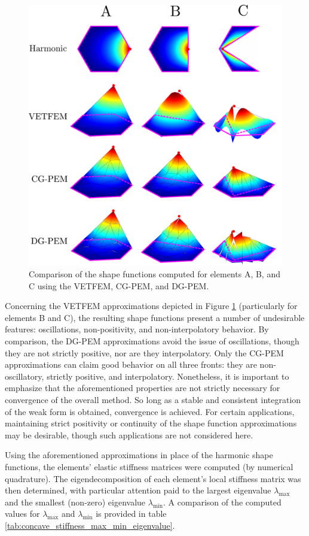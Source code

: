 \begin{figure}[!h]
  \centering
  \includegraphics[width=5.0in]{figures/concave_element_comparison.pdf}  \caption{Comparison of the shape functions computed for elements A, B, and C using the VETFEM, CG-PEM, and DG-PEM.}
  \label{fig:concave_element_comparison}
\end{figure}

Concerning the VETFEM approximations depicted in Figure \ref{fig:concave_element_comparison} (particularly for elements B and C), the resulting shape functions present a number of undesirable features: oscillations, non-positivity, and non-interpolatory behavior. By comparison, the DG-PEM approximations avoid the issue of oscillations, though they are not strictly positive, nor are they interpolatory. Only the CG-PEM approximations can claim good behavior on all three fronts: they are non-oscillatory, strictly positive, and interpolatory. Nonetheless, it is important to emphasize that the aforementioned properties are not strictly necessary for convergence of the overall method. So long as a stable and consistent integration of the weak form is obtained, convergence is achieved. For certain applications, maintaining strict positivity or continuity of the shape function approximations may be desirable, though such applications are not considered here.

Using the aforementioned approximations in place of the harmonic shape functions, the elements' elastic stiffness matrices were computed (by numerical quadrature). The eigendecomposition of each element's local stiffness matrix was then determined, with particular attention paid to the largest eigenvalue $\lambda_{\max}$ and the smallest (non-zero) eigenvalue $\lambda_{\min}$. A comparison of the computed values for $\lambda_{\max}$ and $\lambda_{\min}$ is provided in table \ref{tab:concave_stiffness_max_min_eigenvalue}.

